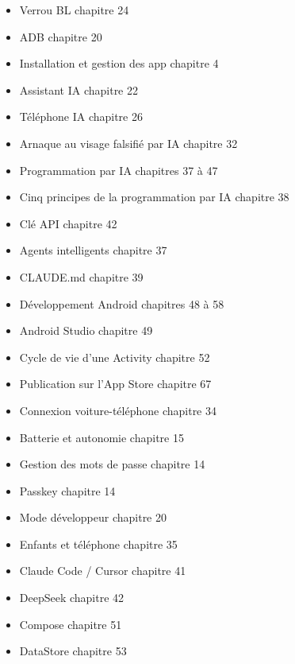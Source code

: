 


\begin{itemize}
  \item Verrou BL chapitre 24
  \item ADB chapitre 20
  \item Installation et gestion des app chapitre 4
  \item Assistant IA chapitre 22
  \item Téléphone IA chapitre 26
  \item Arnaque au visage falsifié par IA chapitre 32
  \item Programmation par IA chapitres 37 à 47
  \item Cinq principes de la programmation par IA chapitre 38
  \item Clé API chapitre 42
  \item Agents intelligents chapitre 37
  \item CLAUDE.md chapitre 39
  \item Développement Android chapitres 48 à 58
  \item Android Studio chapitre 49
  \item Cycle de vie d'une Activity chapitre 52
  \item Publication sur l'App Store chapitre 67
\end{itemize}


\begin{itemize}
  \item Connexion voiture-téléphone chapitre 34
  \item Batterie et autonomie chapitre 15
  \item Gestion des mots de passe chapitre 14
  \item Passkey chapitre 14
  \item Mode développeur chapitre 20
  \item Enfants et téléphone chapitre 35
  \item Claude Code / Cursor chapitre 41
  \item DeepSeek chapitre 42
  \item Compose chapitre 51
  \item DataStore chapitre 53
\end{itemize}

